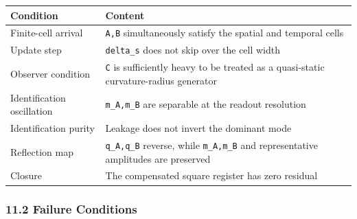 \documentclass[
  a4paper,
]{article}
\newcounter{none} %
\begin{document}
{\def\LTcaptype{none} %
\begin{longtable}[]{@{}
  >{\raggedright\arraybackslash}p{}
  >{\raggedright\arraybackslash}p{}@{}}
\toprule\noalign{}
\begin{minipage}[b]{\linewidth}\raggedright
Condition
\end{minipage} & \begin{minipage}[b]{\linewidth}\raggedright
Content
\end{minipage} \\
\midrule\noalign{}
\endhead
\bottomrule\noalign{}
\endlastfoot
Finite-cell arrival & \texttt{A,B} simultaneously satisfy the spatial
and temporal cells \\
Update step & \texttt{delta\_s} does not skip over the cell width \\
Observer condition & \texttt{C} is sufficiently heavy to be treated as a
quasi-static curvature-radius generator \\
Identification oscillation & \texttt{m\_A,m\_B} are separable at the
readout resolution \\
Identification purity & Leakage does not invert the dominant mode \\
Reflection map & \texttt{q\_A,q\_B} reverse, while \texttt{m\_A,m\_B}
and representative amplitudes are preserved \\
Closure & The compensated square register has zero residual \\
\end{longtable}
}

\subsubsection{11.2 Failure Conditions}\label{failure-conditions}
\end{document}
